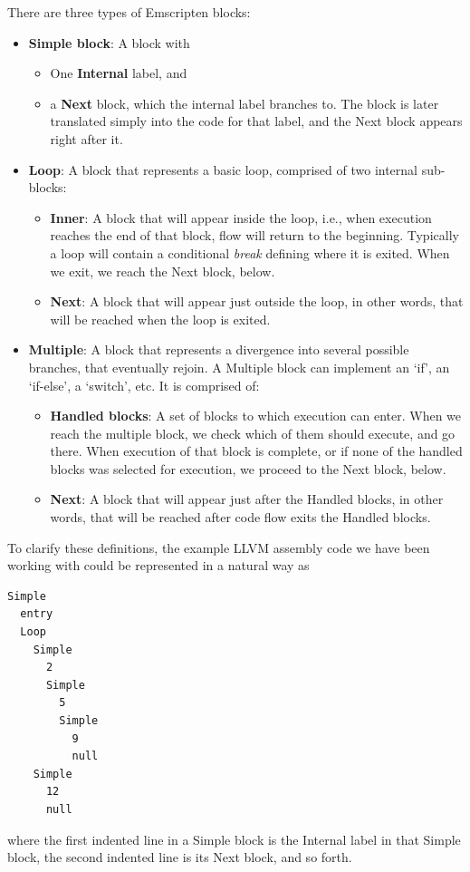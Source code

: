 \documentclass[preprint,10pt]{sigplanconf}
\begin{document}
There are three types of Emscripten blocks:
\begin{itemize}
\item \textbf{Simple block}: A block with
  \begin{itemize}
  \item One \textbf{Internal} label, and
  \item a \textbf{Next}
      block, which the internal label branches to. The block is later
      translated simply into the code for that label, and the Next
      block appears right after it.
  \end{itemize}
\item \textbf{Loop}: A block that represents a basic loop, comprised of
      two internal sub-blocks:
  \begin{itemize}
  \item \textbf{Inner}: A block that will appear inside
        the loop, i.e., when execution reaches the end of that block,
        flow will return to the beginning. Typically a loop will contain
        a conditional \emph{break} defining where it is exited. When we
        exit, we reach the Next block, below.
  \item \textbf{Next}: A block that will appear just outside
        the loop, in other words, that will be reached when the loop is exited.
  \end{itemize}
\item \textbf{Multiple}: A block that represents a divergence into several
      possible branches, that eventually rejoin. A Multiple block can
      implement an `if', an `if-else', a `switch', etc. It is comprised of:
  \begin{itemize}
  \item \textbf{Handled blocks}: A set of blocks to which execution can
        enter. When we reach the multiple block, we check which of them
        should execute, and go there. When execution of that block is
        complete, or if none of the handled blocks was selected for
        execution, we proceed to the Next block, below.
  \item \textbf{Next}: A block that will appear just after the Handled blocks,
        in other words, that will be reached after code flow
        exits the Handled blocks.
  \end{itemize}
\end{itemize}

To clarify these definitions, the example LLVM assembly code we have
been working with could be represented in a natural way as
\begin{verbatim}
Simple
  entry
  Loop
    Simple
      2
      Simple
        5
        Simple
          9
          null
    Simple
      12
      null
\end{verbatim}
where the first indented line in a Simple block is the Internal label in that Simple block, 
the second indented line is its Next block, and so forth.
\end{document}
